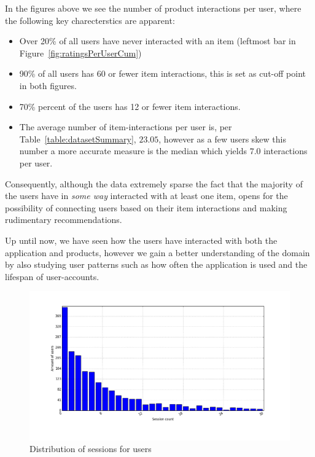 In the figures above we see the number of product interactions per user, where
the following key charecterstics are apparent:

\begin{itemize}
  \item Over 20\% of all users have never interacted with an item (leftmost bar
  in Figure~\ref{fig:ratingsPerUserCum})
  \item 90\% of all users has 60 or fewer item interactions, this is set as
  cut-off point in both figures.
  \item 70\% percent of the users has 12 or fewer item interactions.
  \item The average number of item-interactions per user is, per
  Table~\ref{table:datasetSummary},
  $23.05$, however as a few users skew this number a more accurate measure is
  the median which yields $7.0$ interactions per user.
\end{itemize}

Consequently, although the data extremely sparse the fact that the majority of
the users have in \textit{some way} interacted with at least one item, opens
for the possibility of connecting users based on their item interactions and
making rudimentary recommendations.

Up until now, we have seen how the users have interacted with both the
application and products, however we gain a better understanding of the domain
by also studying user patterns such as how often the application is used and
the lifespan of user-accounts.

\begin{figure}[H]
  \includegraphics[width=5in]{image/sessiondistribution.png}
  \centering
  \caption{Distribution of sessions for users}
  \label{fig:sessCountDist}
\end{figure}

